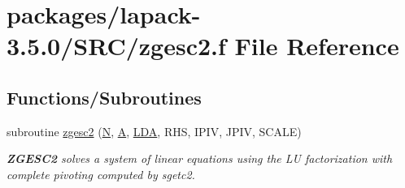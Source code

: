 \hypertarget{zgesc2_8f}{}\section{packages/lapack-\/3.5.0/\+S\+R\+C/zgesc2.f File Reference}
\label{zgesc2_8f}
\subsection*{Functions/\+Subroutines}
\begin{DoxyCompactItemize}
\item 
subroutine \hyperlink{group__complex16GEauxiliary_ga9adcef3bc45139ea3693275252880c29}{zgesc2} (\hyperlink{polmisc_8c_a0240ac851181b84ac374872dc5434ee4}{N}, \hyperlink{classA}{A}, \hyperlink{example__user_8c_ae946da542ce0db94dced19b2ecefd1aa}{L\+D\+A}, R\+H\+S, I\+P\+I\+V, J\+P\+I\+V, S\+C\+A\+L\+E)
\begin{DoxyCompactList}\small\item\em {\bfseries Z\+G\+E\+S\+C2} solves a system of linear equations using the L\+U factorization with complete pivoting computed by sgetc2. \end{DoxyCompactList}\end{DoxyCompactItemize}
